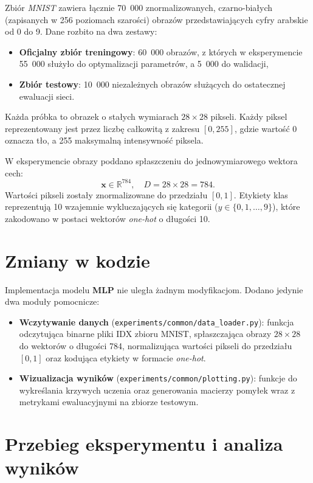 \documentclass[11pt,a4paper]{article}
\begin{document}
Zbiór \textit{MNIST} zawiera łącznie 70~000 znormalizowanych, czarno-białych (zapisanych w 256 poziomach szarości) obrazów przedstawiających cyfry arabskie od 0 do 9.
Dane rozbito na dwa zestawy:
\begin{itemize}
    \item \textbf{Oficjalny zbiór treningowy}: 60~000 obrazów, z których w eksperymencie 55~000 służyło do optymalizacji parametrów, a 5~000 do walidacji,
    \item \textbf{Zbiór testowy}: 10~000 niezależnych obrazów służących do ostatecznej ewaluacji sieci.
\end{itemize}

Każda próbka to obrazek o stałych wymiarach $28 \times 28$ pikseli.
Każdy piksel reprezentowany jest przez liczbę całkowitą z zakresu $[0, 255]$, gdzie wartość 0 oznacza tło,
a 255 maksymalną intensywność piksela.

W eksperymencie obrazy poddano spłaszczeniu do jednowymiarowego wektora cech:
\begin{equation}
    \mathbf{x} \in \mathbb{R}^{784}, \quad D = 28 \times 28 = 784.
\end{equation}
Wartości pikseli zostały znormalizowane do przedziału $[0, 1]$.
Etykiety klas reprezentują 10 wzajemnie wykluczających się kategorii
($y \in \{0, 1, \dots, 9\}$), które zakodowano w postaci wektorów \textit{one-hot} o długości 10.

\section{Zmiany w kodzie}

Implementacja modelu \textbf{MLP} nie uległa żadnym modyfikacjom. Dodano jedynie dwa moduły pomocnicze:
\begin{itemize}
    \item \textbf{Wczytywanie danych} (\texttt{experiments/common/data\_loader.py}): funkcja odczytująca binarne pliki IDX zbioru MNIST,
    spłaszczająca obrazy $28 \times 28$ do wektorów o długości 784, normalizująca wartości pikseli do przedziału $[0, 1]$ oraz kodująca etykiety w formacie \textit{one-hot}.
    \item \textbf{Wizualizacja wyników} (\texttt{experiments/common/plotting.py}): funkcje do wykreślania krzywych uczenia oraz generowania macierzy pomyłek wraz z metrykami ewaluacyjnymi na zbiorze testowym.
\end{itemize}

\section{Przebieg eksperymentu i analiza wyników}
\end{document}
